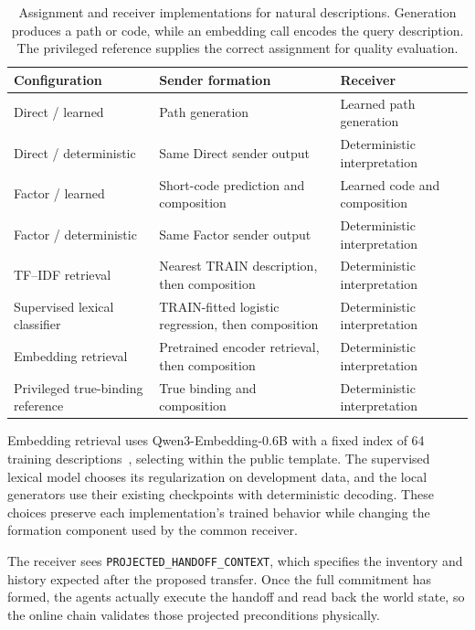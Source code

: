 \documentclass[sigconf,nonacm,balance=false]{aamas}
\newcommand{\tabstyle}{\small\setlength{\tabcolsep}{3pt}\renewcommand{\arraystretch}{1.10}}
\begin{document}
\begin{table}[!htbp]
\centering\tabstyle
\caption{Assignment and receiver implementations for natural descriptions. Generation produces a path or code, while an embedding call encodes the query description. The privileged reference supplies the correct assignment for quality evaluation.}
\label{tab:online-methods}
\begin{tabularx}{\textwidth}{@{}L{3.5cm} Z L{3.0cm}@{}}
\toprule
Configuration & Sender formation & Receiver\\\midrule
Direct / learned & Path generation & Learned path generation\\
Direct / deterministic & Same Direct sender output & Deterministic interpretation\\
Factor / learned & Short-code prediction and composition & Learned code and composition\\
Factor / deterministic & Same Factor sender output & Deterministic interpretation\\
TF--IDF retrieval & Nearest TRAIN description, then composition & Deterministic interpretation\\
Supervised lexical classifier & TRAIN-fitted logistic regression, then composition & Deterministic interpretation\\
Embedding retrieval & Pretrained encoder retrieval, then composition & Deterministic interpretation\\
Privileged true-binding reference & True binding and composition & Deterministic interpretation\\
\bottomrule\end{tabularx}\end{table}

Embedding retrieval uses Qwen3-Embedding-0.6B with a fixed index of 64 training descriptions~\cite{qwen3embedding2025}, selecting within the public template. The supervised lexical model chooses its regularization on development data, and the local generators use their existing checkpoints with deterministic decoding. These choices preserve each implementation's trained behavior while changing the formation component used by the common receiver.

The receiver sees \texttt{PROJECTED\_HANDOFF\_CONTEXT}, which specifies the inventory and history expected after the proposed transfer. Once the full commitment has formed, the agents actually execute the handoff and read back the world state, so the online chain validates those projected preconditions physically.
\end{document}
